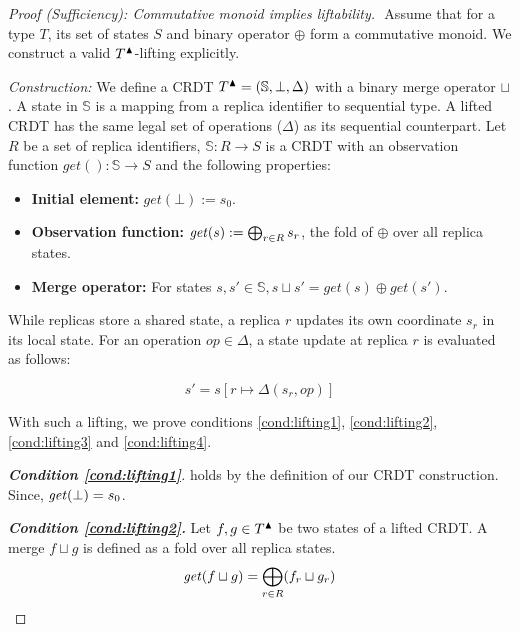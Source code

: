 \begin{proof}[Proof (Sufficiency): Commutative monoid implies liftability]$ $\newline
 Assume that for a type $T$, its set of states $S$ and binary operator $\oplus$ form a commutative monoid. We construct a valid $T{}^{\blacktriangle}{}$-lifting explicitly.

\noindent\emph{Construction:} We define a CRDT $T{}^{\blacktriangle}{}  = (\mathbb{S}, \bot, \Delta)$ with a binary merge operator $\sqcup$. 
A state in $\mathbb{S}$ is a mapping from a replica identifier to sequential type. 
A lifted CRDT has the same legal set of operations ($\Delta$) as its sequential counterpart.
Let $R$ be a set of replica identifiers, $\mathbb{S} :R \to S$ is a CRDT with an observation function $get(): \mathbb{S} \rightarrow S$ and the following properties:  

\begin{itemize}
\item \textbf{Initial element:} $get(\bot) := s_0$.
\item \textbf{Observation function:} $\mathit{get}(s) := \bigoplus_{r \in R} s_r$, the fold of $\oplus$ over all replica states.
\item \textbf{Merge operator:} For states $s, s' \in \mathbb{S}, s \sqcup s' = get(s) \oplus get(s')$.
\end{itemize}

While replicas store a shared state, a replica $r$ updates its own coordinate $s_r$ in its local state. For an operation $op \in \Delta$, a state update at replica $r$ is evaluated as follows: 

\[s' = s[r \mapsto \Delta(s_r, op)]\]


With such a lifting, we prove conditions \ref{cond:lifting1}, \ref{cond:lifting2}, \ref{cond:lifting3} and \ref{cond:lifting4}.  

\medskip
\noindent\emph{\textbf{Condition \ref{cond:lifting1}}.} holds by the definition of our CRDT construction. Since, $\mathit{get}(\bot) = s_0$. 


\medskip
\noindent\emph{\textbf{Condition \ref{cond:lifting2}.}}
Let $f, g \in T{}^{\blacktriangle}{}$ be two states of a lifted CRDT. A merge $f \sqcup g$ is defined as a fold over all replica states. 
\[
\mathit{get}(f \sqcup g) = \bigoplus_{r \in R} (f_r \sqcup g_r)
\]


\end{proof}
